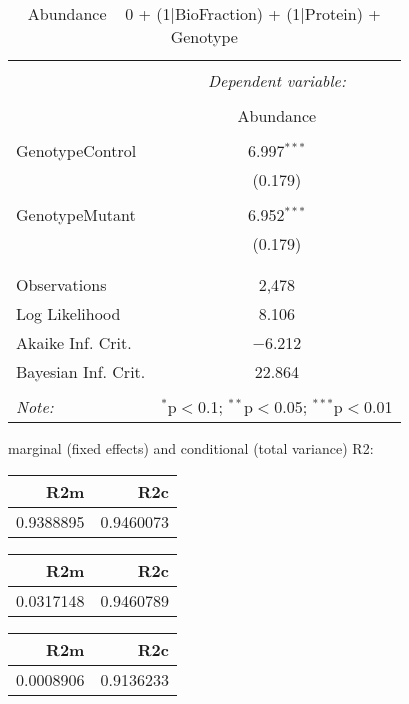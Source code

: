 \documentclass[11pt]{report}
\begin{document}
\begin{table}[!htbp] \centering 
  \caption{Abundance ~ 0 + (1|BioFraction) + (1|Protein) + Genotype} 
  \label{} 
\begin{tabular}{@{\extracolsep{5pt}}lc} 
\\[-1.8ex]\hline 
\hline \\[-1.8ex] 
 & \multicolumn{1}{c}{\textit{Dependent variable:}} \\ 
\cline{2-2} 
\\[-1.8ex] & Abundance \\ 
\hline \\[-1.8ex] 
 GenotypeControl & 6.997$^{***}$ \\ 
  & (0.179) \\ 
  & \\ 
 GenotypeMutant & 6.952$^{***}$ \\ 
  & (0.179) \\ 
  & \\ 
\hline \\[-1.8ex] 
Observations & 2,478 \\ 
Log Likelihood & 8.106 \\ 
Akaike Inf. Crit. & $-$6.212 \\ 
Bayesian Inf. Crit. & 22.864 \\ 
\hline 
\hline \\[-1.8ex] 
\textit{Note:}  & \multicolumn{1}{r}{$^{*}$p$<$0.1; $^{**}$p$<$0.05; $^{***}$p$<$0.01} \\ 
\end{tabular} 
\end{table} 
marginal (fixed effects) and conditional (total variance) R2:

\begin{tabular}{r|r}
\hline
R2m & R2c\\
\hline
0.9388895 & 0.9460073\\
\hline
\end{tabular}

\begin{tabular}{r|r}
\hline
R2m & R2c\\
\hline
0.0317148 & 0.9460789\\
\hline
\end{tabular}

\begin{tabular}{r|r}
\hline
R2m & R2c\\
\hline
0.0008906 & 0.9136233\\
\hline
\end{tabular}
\end{document}
